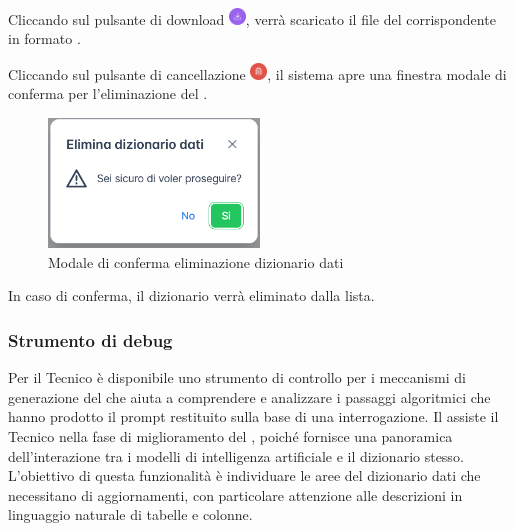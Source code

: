 \par Cliccando sul pulsante di download \includegraphics[height=1.2em]{assets/dd_download_button.png}, verrà scaricato il file del  corrispondente in formato .

\par Cliccando sul pulsante di cancellazione \includegraphics[height=1.2em]{assets/dd_delete_button.png}, il sistema apre una finestra modale di conferma per l'eliminazione del .
\begin{figure}[H]
  \centering
  \includegraphics[width=0.5\textwidth]{assets/dd_confirm_delete.png}
  \caption{Modale di conferma eliminazione dizionario dati}
\end{figure}
\par In caso di conferma, il dizionario verrà eliminato dalla lista.

\subsubsection{Strumento di debug}

\par Per il Tecnico è disponibile uno strumento di controllo per i meccanismi di generazione del  che aiuta a comprendere e analizzare i passaggi algoritmici che hanno prodotto il prompt restituito sulla base di una interrogazione. Il  assiste il Tecnico nella fase di miglioramento del , poiché fornisce una panoramica dell'interazione tra i modelli di intelligenza artificiale e il dizionario stesso. L'obiettivo di questa funzionalità è individuare le aree del dizionario dati che necessitano di aggiornamenti, con particolare attenzione alle descrizioni in linguaggio naturale di tabelle e colonne.

